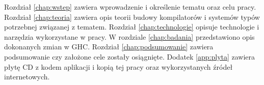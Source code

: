 Rozdział \ref{chap:wstep} zawiera wprowadzenie i określenie tematu oraz celu
pracy. Rozdział \ref{chap:teoria} zawiera opis teorii budowy kompilatorów i
systemów typów potrzebnej związanej z tematem. Rozdział \ref{chap:technologie}
opisuje technologie i narzędzia wykorzystane w pracy. W rozdziale
\ref{chap:badania} przedstawiono opis dokonanych zmian w GHC. Rozdział
\ref{chap:podsumowanie} zawiera podsumowanie czy założone cele zostały
osiągnięte. Dodatek \ref{app:plyta} zawiera płytę CD z kodem aplikacji
i kopią tej pracy oraz
wykorzystanych źródeł internetowych.

